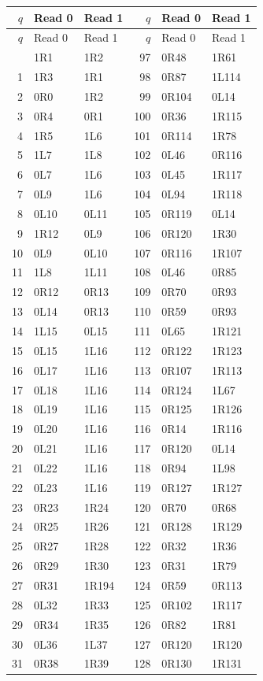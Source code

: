 \begingroup\small\ttfamily\renewcommand{\arraystretch}{0.96}
\begin{longtable}{rll@{\hspace{1.2cm}}rll}
\toprule
$q$ & Read 0 & Read 1 & $q$ & Read 0 & Read 1 \\
\midrule\endfirsthead
\toprule
$q$ & Read 0 & Read 1 & $q$ & Read 0 & Read 1 \\
\midrule\endhead
\bottomrule\endfoot
0&1R1&1R2&97&0R48&1R61\\
1&1R3&1R1&98&0R87&1L114\\
2&0R0&1R2&99&0R104&0L14\\
3&0R4&0R1&100&0R36&1R115\\
4&1R5&1L6&101&0R114&1R78\\
5&1L7&1L8&102&0L46&0R116\\
6&0L7&1L6&103&0L45&1R117\\
7&0L9&1L6&104&0L94&1R118\\
8&0L10&0L11&105&0R119&0L14\\
9&1R12&0L9&106&0R120&1R30\\
10&0L9&0L10&107&0R116&1R107\\
11&1L8&1L11&108&0L46&0R85\\
12&0R12&0R13&109&0R70&0R93\\
13&0L14&0R13&110&0R59&0R93\\
14&1L15&0L15&111&0L65&1R121\\
15&0L15&1L16&112&0R122&1R123\\
16&0L17&1L16&113&0R107&1R113\\
17&0L18&1L16&114&0R124&1L67\\
18&0L19&1L16&115&0R125&1R126\\
19&0L20&1L16&116&0R14&1R116\\
20&0L21&1L16&117&0R120&0L14\\
21&0L22&1L16&118&0R94&1L98\\
22&0L23&1L16&119&0R127&1R127\\
23&0R23&1R24&120&0R70&0R68\\
24&0R25&1R26&121&0R128&1R129\\
25&0R27&1R28&122&0R32&1R36\\
26&0R29&1R30&123&0R31&1R79\\
27&0R31&1R194&124&0R59&0R113\\
28&0L32&1R33&125&0R102&1R117\\
29&0R34&1R35&126&0R82&1R81\\
30&0L36&1L37&127&0R120&1R120\\
31&0R38&1R39&128&0R130&1R131\\

\end{longtable}
